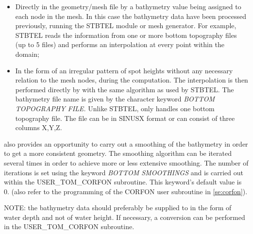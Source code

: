 \begin{itemize}
\item  Directly in the geometry/mesh file by a bathymetry value being assigned to each node in the mesh. In this case the bathymetry data have been processed previously, running the STBTEL module or mesh generator. For example, STBTEL reads the information from one or more bottom topography files (up to 5 files) and performs an interpolation at every point within the domain;

\item  In the form of an irregular pattern of spot heights without any necessary relation to the mesh nodes, during the \tomawac computation. The interpolation is then performed directly by \tomawac with the same algorithm as used by STBTEL. The bathymetry file name is given by the character keyword \textit{BOTTOM TOPOGRAPHY FILE. }Unlike STBTEL, \tomawac only handles one bottom topography file. The file can be in SINUSX format or can consist of three columns X,Y,Z.
\end{itemize}

 \tomawac also provides an opportunity to carry out a smoothing of the bathymetry in order to get a more consistent geometry. The smoothing algorithm can be iterated several times in order to achieve more or less extensive smoothing. The number of iterations is set using the keyword \textit{BOTTOM SMOOTHINGS} and is carried out within the USER\_TOM\_CORFON subroutine. This keyword's default value is 0. (also refer to the programming of the CORFON user subroutine in \ref{se:corfon}).

 NOTE: the bathymetry data should preferably be supplied to \tomawac in the form of water depth and not of water height. If necessary, a conversion can be performed in the USER\_TOM\_CORFON subroutine.


